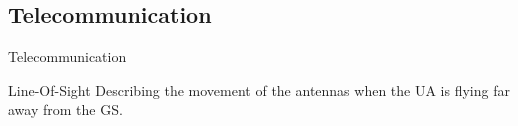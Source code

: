 \subsection{Telecommunication}

\begin{frame}{Telecommunication}{}

   \begin{block}{Line-Of-Sight}
      Describing the movement of the antennas when the UA is flying far away from the GS. 
    \end{block}

  \begin{figure}[H]
    \centerline{
    }
  \end{figure}

\end{frame}

